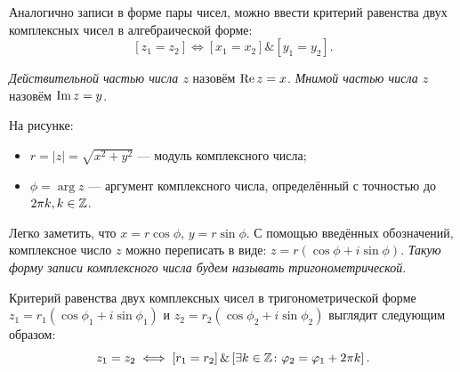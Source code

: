Аналогично записи в форме пары чисел, можно ввести критерий равенства двух комплексных чисел в
алгебраической форме:
\[
    \left[z_1 = z_2\right] \iff \left[x_1 = x_2\right] \& \left[y_1 = y_2\right].
\]

\begin{definition}
\textit{Действительной частью числа \(z\)} назовём \(\operatorname{Re}{z} = x\). \textit{Мнимой частью числа
\(z\)} назовём \(\operatorname{Im}{z} = y\).
\end{definition}

\noindent
\begin{minipage}[c]{0.4\textwidth}
  \centering
\end{minipage}%
\hfill
\begin{minipage}[c]{0.6\textwidth}
На рисунке:
\begin{itemize}
\item \(r = |z| = \sqrt{x^2 + y^2}\) — модуль комплексного числа;
\item \(\phi = \arg z\) — аргумент комплексного числа, определённый с точностью до \(2\pi k, k \in
    \mathbb{Z}\).
\end{itemize}
\end{minipage}

\begin{definition}
Легко заметить, что \(x = r\cos{\phi}\), \(y = r\sin{\phi}\). С помощью введённых обозначений,
комплексное число \(z\) можно переписать в виде: \(z = r(\cos{\phi} + i\sin{\phi})\). \textit{Такую
форму записи комплексного числа будем называть тригонометрической}.

Критерий равенства двух комплексных чисел в тригонометрической форме \(z_1 = r_1(\cos{\phi_1} +
i\sin{\phi_1})\) и \(z_2 = r_2(\cos{\phi_2} + i\sin{\phi_2})\) выглядит следующим образом:
\[
    z_1 = z_2 \iff \left[r_1 = r_2\right] \& \left[\exists k \in \mathbb{Z} \colon \varphi_2 = \varphi_1 + 2\pi
        k\right].
\]
\end{definition}

